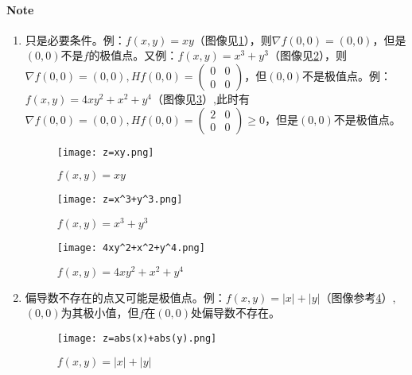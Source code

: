 \documentclass[UTF8]{ctexart}
\begin{document}
    \paragraph{\colorbox{orange!75}{Note}}\begin{enumerate}
        \item 只是必要条件。例：$f(x,y)=xy$（图像见\ref{xy}），则$\nabla f(0,0)=(0,0)$，但是$(0,0)$不是$f$的极值点。又例：$f(x,y)=x^3+y^3$（图像见\ref{x^3+y^3}），则$\nabla f(0,0)=(0,0),Hf(0,0)=\begin{pmatrix}
            0&0\\
            0&0
        \end{pmatrix}$，但$(0,0)$不是极值点。例：$f(x,y)=4xy^2+x^2+y^4$（图像见\ref{4xy^2+x^2+y^4}）,此时有$\nabla f(0,0)=(0,0),Hf(0,0)=\begin{pmatrix}
            2&0\\
            0&0
        \end{pmatrix}\ge 0$，但是$(0,0)$不是极值点。

        \begin{figure}[h!t!b!p]
            \centering
            \texttt{[image: z=xy.png]}
            \caption{$f(x,y)=xy$}
            \label{xy}
        \end{figure}

        \begin{figure}[h!t!b!p]
            \centering
            \texttt{[image: z=x^3+y^3.png]}
            \caption{$f(x,y)=x^3+y^3$}
            \label{x^3+y^3}
        \end{figure}

        \begin{figure}[h!t!b!p]
            \centering
            \texttt{[image: 4xy^2+x^2+y^4.png]}
            \caption{$f(x,y)=4xy^2+x^2+y^4$}
            \label{4xy^2+x^2+y^4}
        \end{figure}

        \item 偏导数不存在的点又可能是极值点。例：$f(x,y)=|x|+|y|$（图像参考\ref{abs(x)+abs(y)}）,$(0,0)$为其极小值，但$f$在$(0,0)$处偏导数不存在。
        \begin{figure}[h!t!b!p]
            \centering
            \texttt{[image: z=abs(x)+abs(y).png]}
            \caption{$f(x,y)=|x|+|y|$}
            \label{abs(x)+abs(y)}
        \end{figure}
    \end{enumerate}
\end{document}
